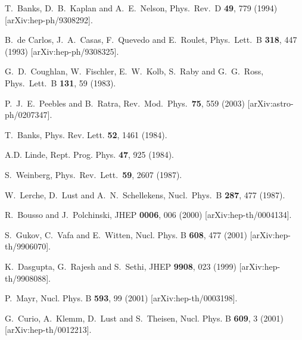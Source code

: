 \documentclass[aps,amsfonts]{ar2e}
\begin{document}
\begin{thebibliography}{999}
  T.~Banks, D.~B.~Kaplan and A.~E.~Nelson,
  Phys.\ Rev.\ D {\bf 49}, 779 (1994)
  [arXiv:hep-ph/9308292].

  B.~de Carlos, J.~A.~Casas, F.~Quevedo and E.~Roulet,
  Phys.\ Lett.\ B {\bf 318}, 447 (1993)
  [arXiv:hep-ph/9308325].

  G.~D.~Coughlan, W.~Fischler, E.~W.~Kolb, S.~Raby and G.~G.~Ross,
  Phys.\ Lett.\ B {\bf 131}, 59 (1983).

  P.~J.~E.~Peebles and B.~Ratra,
  Rev.\ Mod.\ Phys.\  {\bf 75}, 559 (2003)
  [arXiv:astro-ph/0207347].

T.~Banks, Phys. Rev. Lett. {\bf 52}, 1461 (1984).

A.D. Linde, Rept. Prog. Phys. {\bf 47}, 925 (1984).

  S.~Weinberg,
  Phys.\ Rev.\ Lett.\  {\bf 59}, 2607 (1987).

  W.~Lerche, D.~Lust and A.~N.~Schellekens,
  Nucl.\ Phys.\ B {\bf 287}, 477 (1987).

  R.~Bousso and J.~Polchinski,
  JHEP {\bf 0006}, 006 (2000)
  [arXiv:hep-th/0004134].

S.~Gukov, C.~Vafa and E.~Witten, Nucl. Phys. B {\bf 608}, 477 (2001)
[arXiv:hep-th/9906070].

K.~Dasgupta, G.~Rajesh and S.~Sethi, JHEP {\bf 9908}, 023 (1999)
[arXiv:hep-th/9908088].

P.~Mayr, Nucl. Phys. B {\bf 593}, 99 (2001) [arXiv:hep-th/0003198].

G.~Curio, A.~Klemm, D.~Lust and S.~Theisen, Nucl. Phys. B {\bf 609},
3 (2001) [arXiv:hep-th/0012213].


\end{thebibliography}
\end{document}

